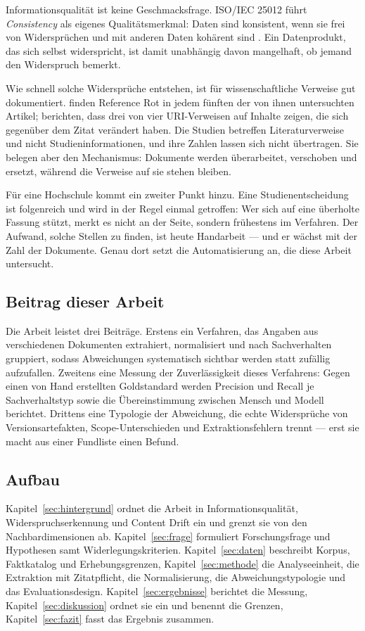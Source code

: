 Informationsqualität ist keine Geschmacksfrage. ISO/IEC 25012 führt \emph{Consistency} als
eigenes Qualitätsmerkmal: Daten sind konsistent, wenn sie frei von Widersprüchen und mit
anderen Daten kohärent sind \parencite{iso25012}. Ein Datenprodukt, das sich selbst
widerspricht, ist damit unabhängig davon mangelhaft, ob jemand den Widerspruch bemerkt.

Wie schnell solche Widersprüche entstehen, ist für wissenschaftliche Verweise gut
dokumentiert. \textcite{klein2014} finden Reference Rot in jedem fünften der von ihnen
untersuchten Artikel; \textcite{jones2016} berichten, dass drei von vier URI-Verweisen auf
Inhalte zeigen, die sich gegenüber dem Zitat verändert haben. Die Studien betreffen
Literaturverweise und nicht Studieninformationen, und ihre Zahlen lassen sich nicht
übertragen. Sie belegen aber den Mechanismus: Dokumente werden überarbeitet, verschoben und
ersetzt, während die Verweise auf sie stehen bleiben.

Für eine Hochschule kommt ein zweiter Punkt hinzu. Eine Studienentscheidung ist folgenreich
und wird in der Regel einmal getroffen: Wer sich auf eine überholte Fassung stützt, merkt es
nicht an der Seite, sondern frühestens im Verfahren. Der Aufwand, solche Stellen zu finden,
ist heute Handarbeit --- und er wächst mit der Zahl der Dokumente. Genau dort setzt die
Automatisierung an, die diese Arbeit untersucht.

\subsection{Beitrag dieser Arbeit}

Die Arbeit leistet drei Beiträge. Erstens ein Verfahren, das Angaben aus verschiedenen
Dokumenten extrahiert, normalisiert und nach Sachverhalten gruppiert, sodass Abweichungen
systematisch sichtbar werden statt zufällig aufzufallen. Zweitens eine Messung der
Zuverlässigkeit dieses Verfahrens: Gegen einen von Hand erstellten Goldstandard werden
Precision und Recall je Sachverhaltstyp sowie die Übereinstimmung zwischen Mensch und Modell
berichtet. Drittens eine Typologie der Abweichung, die echte Widersprüche von
Versionsartefakten, Scope-Unterschieden und Extraktionsfehlern trennt --- erst sie macht aus
einer Fundliste einen Befund.

\subsection{Aufbau}

Kapitel~\ref{sec:hintergrund} ordnet die Arbeit in Informationsqualität,
Widerspruchserkennung und Content Drift ein und grenzt sie von den Nachbardimensionen ab.
Kapitel~\ref{sec:frage} formuliert Forschungsfrage und Hypothesen samt
Widerlegungskriterien. Kapitel~\ref{sec:daten} beschreibt Korpus, Faktkatalog und
Erhebungsgrenzen, Kapitel~\ref{sec:methode} die Analyseeinheit, die Extraktion mit
Zitatpflicht, die Normalisierung, die Abweichungstypologie und das Evaluationsdesign.
Kapitel~\ref{sec:ergebnisse} berichtet die Messung, Kapitel~\ref{sec:diskussion} ordnet sie
ein und benennt die Grenzen, Kapitel~\ref{sec:fazit} fasst das Ergebnis zusammen.
